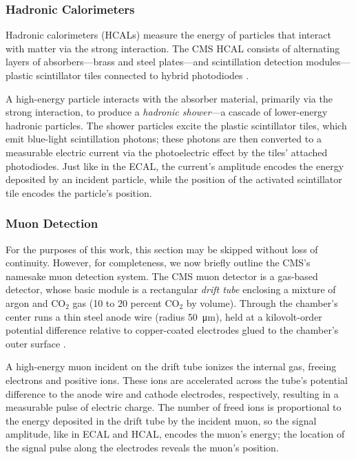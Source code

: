 \documentclass[11pt, a4paper]{article}
\newcommand{\chem}[1]{\ensuremath{\mathrm{#1}}}  %
\begin{document}
\subsubsection{Hadronic Calorimeters}
Hadronic calorimeters (HCALs) measure the energy of particles that interact with matter via the strong interaction. The CMS HCAL consists of alternating layers of absorbers---brass and steel plates---and scintillation detection modules---plastic scintillator tiles connected to hybrid photodiodes \cite{hcal-tdr}.

A high-energy particle interacts with the absorber material, primarily via the strong interaction, to produce a \textit{hadronic shower}---a cascade of lower-energy hadronic particles. The shower particles excite the plastic scintillator tiles, which emit blue-light scintillation photons; these photons are then converted to a measurable electric current via the photoelectric effect by the tiles' attached photodiodes. Just like in the ECAL, the current's amplitude encodes the energy deposited by an incident particle, while the position of the activated scintillator tile encodes the particle's position.

\subsubsection{Muon Detection}
For the purposes of this work, this section may be skipped without loss of continuity. However, for completeness, we now briefly outline the CMS's namesake muon detection system. The CMS muon detector is a gas-based detector, whose basic module is a rectangular \textit{drift tube} enclosing a mixture of argon and \chem{CO_2} gas (10 to 20 percent \chem{CO_2} by volume). Through the chamber's center runs a thin steel anode wire (radius \SI{50}{\micro \meter}), held at a kilovolt-order potential difference relative to copper-coated electrodes glued to the chamber's outer surface \cite{muon-tdr}.

A high-energy muon incident on the drift tube ionizes the internal gas, freeing electrons and positive ions. These ions are accelerated across the tube's potential difference to the anode wire and cathode electrodes, respectively, resulting in a measurable pulse of electric charge. The number of freed ions is proportional to the energy deposited in the drift tube by the incident muon, so the signal amplitude, like in ECAL and HCAL, encodes the muon's energy; the location of the signal pulse along the electrodes reveals the muon's position. 
\end{document}

